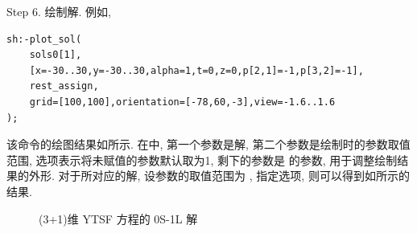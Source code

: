 Step 6. 绘制解. 例如, 
\begin{verbatim}
sh:-plot_sol(
    sols0[1],
    [x=-30..30,y=-30..30,alpha=1,t=0,z=0,p[2,1]=-1,p[3,2]=-1],
    rest_assign,
    grid=[100,100],orientation=[-78,60,-3],view=-1.6..1.6
);
\end{verbatim}
该命令的绘图结果如所示. 在中, 第一个参数是解, 第二个参数是绘制时的参数取值范围, 选项表示将未赋值的参数默认取为1, 剩下的参数是  的参数, 用于调整绘制结果的外形. 对于所对应的解, 设参数的取值范围为 \cd{[x=-30..30,y=-30..30,alpha=1,t=0,z=0]}, 指定选项, 则可以得到如所示的结果.

\begin{figure}[htbp]
\centering
{}
\caption{(3+1)维 YTSF 方程的 0S-1L 解}
\end{figure}

